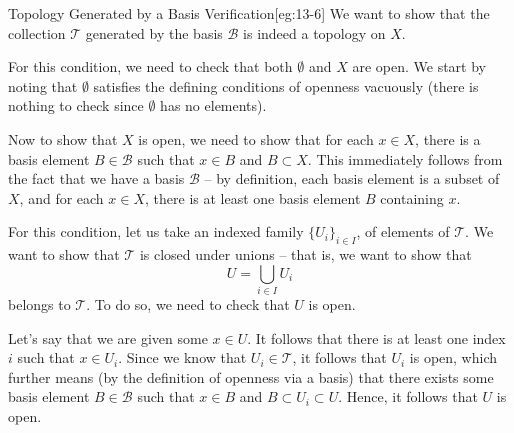 \begin{egBox}{Topology Generated by a Basis Verification}[eg:13-6]
    We want to show that the collection \( \mathcal{T} \) generated by the basis \( \mathcal{B} \) is indeed a topology on 
    \( X \).  
    
    \baseSkip 
    \baseSkip

    For this condition, we need to check that both \( \emptyset \) and \( X \) 
    are open. 
    We start by noting that \( \emptyset \) satisfies the defining conditions 
    of openness vacuously (there is nothing to check since \( \emptyset \) has 
    no elements).
    
    \baseSkip

    Now to show that \( X \) is open, we need to show that for each 
    \( x \in X \), there is a basis element \( B \in \mathcal{B} \) 
    such that \( x \in B \) and \( B \subset X \). 
    This immediately follows from the fact that we have a basis 
    \( \mathcal{B} \) -- by definition, each basis element is a subset of 
    \( X \), and for each \( x \in X \), there is at least one basis element 
    \( B \) containing \( x \).

    \baseSkip 
    \baseSkip

    For this condition, let us take an indexed family 
    \( \{ U_{ i } \}_{ i \in I } \), of elements of \( \mathcal{T} \). 
    We want to show that \( \mathcal{T} \) is closed under unions -- 
    that is, we want to show that 
    \begin{equation*}
        U = \bigcup_{ i \in I } U_{ i }
    \end{equation*}
    belongs to \( \mathcal{T} \). 
    To do so, we need to check that \( U \) is open. 
    
    \baseSkip
    
    Let's say that we are given some \( x \in U \). 
    It follows that there is at least one index \( i \) such that 
    \( x \in U_{ i } \). 
    Since we know that \( U_{ i } \in \mathcal{T} \), it follows that 
    \( U_{ i } \) is open, which further means (by the definition of 
    openness via a basis) that there exists some basis element 
    \( B \in \mathcal{B} \) such that \( x \in B \) and \( B \subset U_{ i } 
    \subset U \). 
    Hence, it follows that \( U \) is open.

    \baseSkip 
    \baseSkip


\end{egBox}
